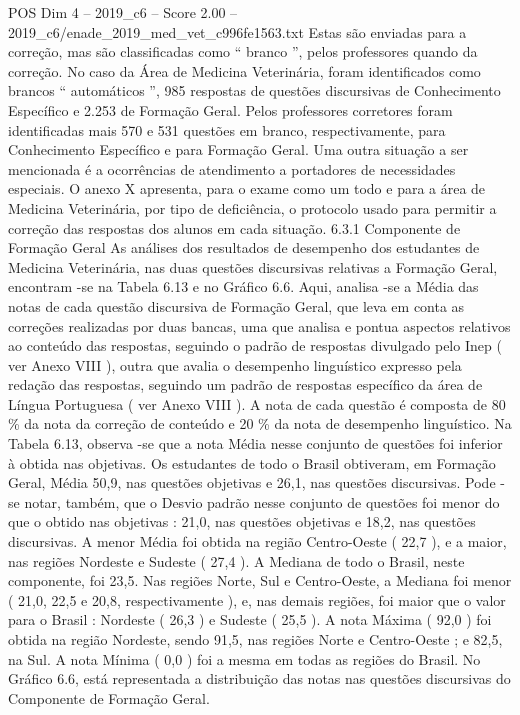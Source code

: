 \begin{textsample}{POS Dim 4 – 2019\_c6 – Score 2.00 – 2019\_c6/enade\_2019\_med\_vet\_c996fe1563.txt}
Estas são enviadas para a correção, mas são classificadas como “ branco ”, pelos professores quando da correção.
No caso da Área de Medicina Veterinária, foram identificados como brancos “ automáticos ”, 985 respostas de questões discursivas de Conhecimento Específico e 2.253 de Formação Geral.
Pelos professores corretores foram identificadas mais 570 e 531 questões em branco, respectivamente, para Conhecimento Específico e para Formação Geral.
Uma outra situação a ser mencionada é a ocorrências de atendimento a portadores de necessidades especiais.
O anexo X apresenta, para o exame como um todo e para a área de Medicina Veterinária, por tipo de deficiência, o protocolo usado para permitir a correção das respostas dos alunos em cada situação. 6.3.1 Componente de Formação Geral As análises dos resultados de desempenho dos estudantes de Medicina Veterinária, nas duas questões discursivas relativas a Formação Geral, encontram -se na Tabela 6.13 e no Gráfico 6.6.
Aqui, analisa -se a Média das notas de cada questão discursiva de Formação Geral, que leva em conta as correções realizadas por duas bancas, uma que analisa e pontua aspectos relativos ao conteúdo das respostas, seguindo o padrão de respostas divulgado pelo Inep ( ver Anexo VIII ), outra que avalia o desempenho linguístico expresso pela redação das respostas, seguindo um padrão de respostas específico da área de Língua Portuguesa ( ver Anexo VIII ).
A nota de cada questão é composta de 80 \% da nota da correção de conteúdo e 20 \% da nota de desempenho linguístico.
Na Tabela 6.13, observa -se que a nota Média nesse conjunto de questões foi inferior à obtida nas objetivas.
Os estudantes de todo o Brasil obtiveram, em Formação Geral, Média 50,9, nas questões objetivas e 26,1, nas questões discursivas.
Pode -se notar, também, que o Desvio padrão nesse conjunto de questões foi menor do que o obtido nas objetivas : 21,0, nas questões objetivas e 18,2, nas questões discursivas.
A menor Média foi obtida na região Centro-Oeste ( 22,7 ), e a maior, nas regiões Nordeste e Sudeste ( 27,4 ).
A Mediana de todo o Brasil, neste componente, foi 23,5.
Nas regiões Norte, Sul e Centro-Oeste, a Mediana foi menor ( 21,0, 22,5 e 20,8, respectivamente ), e, nas demais regiões, foi maior que o valor para o Brasil : Nordeste ( 26,3 ) e Sudeste ( 25,5 ).
A nota Máxima ( 92,0 ) foi obtida na região Nordeste, sendo 91,5, nas regiões Norte e Centro-Oeste ; e 82,5, na Sul.
A nota Mínima ( 0,0 ) foi a mesma em todas as regiões do Brasil.
No Gráfico 6.6, está representada a distribuição das notas nas questões discursivas do Componente de Formação Geral.

\end{textsample}
